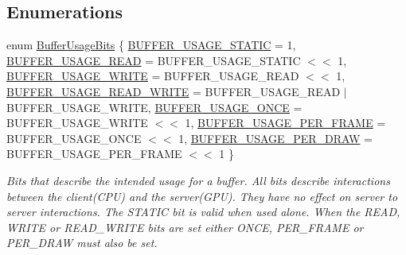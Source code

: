 \subsection*{Enumerations}
\begin{DoxyCompactItemize}
\item 
enum \hyperlink{namespace_g_f_w_a51791713eb2c4bd7901142f4e62a88e6}{Buffer\+Usage\+Bits} \{ \newline
\hyperlink{namespace_g_f_w_a51791713eb2c4bd7901142f4e62a88e6a8ce4f5d1773718f98baf99e6b6f3ef8f}{B\+U\+F\+F\+E\+R\+\_\+\+U\+S\+A\+G\+E\+\_\+\+S\+T\+A\+T\+IC} = 1, 
\hyperlink{namespace_g_f_w_a51791713eb2c4bd7901142f4e62a88e6a5968da6f14a32344fbd48ab8bb851c26}{B\+U\+F\+F\+E\+R\+\_\+\+U\+S\+A\+G\+E\+\_\+\+R\+E\+AD} = B\+U\+F\+F\+E\+R\+\_\+\+U\+S\+A\+G\+E\+\_\+\+S\+T\+A\+T\+IC $<$$<$ 1, 
\hyperlink{namespace_g_f_w_a51791713eb2c4bd7901142f4e62a88e6a971d614e3a0262829fb4bf15bbd767f1}{B\+U\+F\+F\+E\+R\+\_\+\+U\+S\+A\+G\+E\+\_\+\+W\+R\+I\+TE} = B\+U\+F\+F\+E\+R\+\_\+\+U\+S\+A\+G\+E\+\_\+\+R\+E\+AD $<$$<$ 1, 
\hyperlink{namespace_g_f_w_a51791713eb2c4bd7901142f4e62a88e6af2a96852352f01e9c8c9def2180537ca}{B\+U\+F\+F\+E\+R\+\_\+\+U\+S\+A\+G\+E\+\_\+\+R\+E\+A\+D\+\_\+\+W\+R\+I\+TE} = B\+U\+F\+F\+E\+R\+\_\+\+U\+S\+A\+G\+E\+\_\+\+R\+E\+AD $\vert$ B\+U\+F\+F\+E\+R\+\_\+\+U\+S\+A\+G\+E\+\_\+\+W\+R\+I\+TE, 
\newline
\hyperlink{namespace_g_f_w_a51791713eb2c4bd7901142f4e62a88e6a8c9ddda7d01bb72aedc2ae78a8419904}{B\+U\+F\+F\+E\+R\+\_\+\+U\+S\+A\+G\+E\+\_\+\+O\+N\+CE} = B\+U\+F\+F\+E\+R\+\_\+\+U\+S\+A\+G\+E\+\_\+\+W\+R\+I\+TE $<$$<$ 1, 
\hyperlink{namespace_g_f_w_a51791713eb2c4bd7901142f4e62a88e6a94f78e57995af3d384650c827fad4908}{B\+U\+F\+F\+E\+R\+\_\+\+U\+S\+A\+G\+E\+\_\+\+P\+E\+R\+\_\+\+F\+R\+A\+ME} = B\+U\+F\+F\+E\+R\+\_\+\+U\+S\+A\+G\+E\+\_\+\+O\+N\+CE $<$$<$ 1, 
\hyperlink{namespace_g_f_w_a51791713eb2c4bd7901142f4e62a88e6a9209622ae705ebf6f7b0946757d07f03}{B\+U\+F\+F\+E\+R\+\_\+\+U\+S\+A\+G\+E\+\_\+\+P\+E\+R\+\_\+\+D\+R\+AW} = B\+U\+F\+F\+E\+R\+\_\+\+U\+S\+A\+G\+E\+\_\+\+P\+E\+R\+\_\+\+F\+R\+A\+ME $<$$<$ 1
 \}\begin{DoxyCompactList}\small\item\em Bits that describe the intended usage for a buffer. All bits describe interactions between the client(\+C\+P\+U) and the server(\+G\+P\+U). They have no effect on server to server interactions. The S\+T\+A\+T\+IC bit is valid when used alone. When the R\+E\+AD, W\+R\+I\+TE or R\+E\+A\+D\+\_\+\+W\+R\+I\+TE bits are set either O\+N\+CE, P\+E\+R\+\_\+\+F\+R\+A\+ME or P\+E\+R\+\_\+\+D\+R\+AW must also be set. \end{DoxyCompactList}
$$
\end{DoxyCompactItemize}
